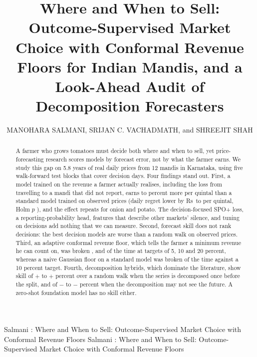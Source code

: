 \documentclass{ieeeaccess}
\newcommand{\Rs}{Rs\,}
\begin{document}

\title{Where and When to Sell: Outcome-Supervised Market Choice with Conformal Revenue Floors for Indian Mandis, and a Look-Ahead Audit of Decomposition Forecasters}

\author{\uppercase{Manohara Salmani},
\uppercase{Srijan C. Vachadmath}, and
\uppercase{Shreejit Shah}}
\address[1]{Department of Computer Science and Engineering (Data Science), B.M.S. College of Engineering, Bengaluru, Karnataka 560019, India (e-mail: manoharsalmani.cd23@bmsce.ac.in; srijanc.cd23@bmsce.ac.in; shreejitshah.cd23@bmsce.ac.in)}

\markboth
{Salmani \headeretal: Where and When to Sell: Outcome-Supervised Market Choice with Conformal Revenue Floors}
{Salmani \headeretal: Where and When to Sell: Outcome-Supervised Market Choice with Conformal Revenue Floors}


\begin{abstract}
A farmer who grows tomatoes must decide both where and when to sell, yet price-forecasting research scores models by forecast error, not by what the farmer earns. We study this gap on 5.8 years of real daily prices from 12 mandis in Karnataka, using five walk-forward test blocks that cover \NTest{} decision days. Four findings stand out. First, a model trained on the revenue a farmer actually realises, including the loss from travelling to a mandi that did not report, earns \PctGainLo{} to \PctGainHi{} percent more per quintal than a standard model trained on observed prices (daily regret lower by \Rs\LabelHiAbs{} to \LabelLoAbs{} per quintal, Holm $p$ \LabelP{}), and the effect repeats for onion and potato. The decision-focused SPO+ loss, a reporting-probability head, features that describe other markets' silence, and tuning on decisions add nothing that we can measure. Second, forecast skill does not rank decisions: the best decision models are worse than a random walk on observed prices. Third, an adaptive conformal revenue floor, which tells the farmer a minimum revenue he can count on, was broken \ViolFive{}, \ViolTen{} and \ViolTwenty{} of the time at targets of 5, 10 and 20 percent, whereas a naive Gaussian floor on a standard model was broken \ViolNaiveObs{} of the time against a 10 percent target. Fourth, decomposition hybrids, which dominate the literature, show skill of $+$\PubLo{} to $+$\PubHi{} percent over a random walk when the series is decomposed once before the split, and of $-$\CauLoAbs{} to $-$\CauHiAbs{} percent when the decomposition may not see the future. A zero-shot foundation model has no skill either.
\end{abstract}
\end{document}
